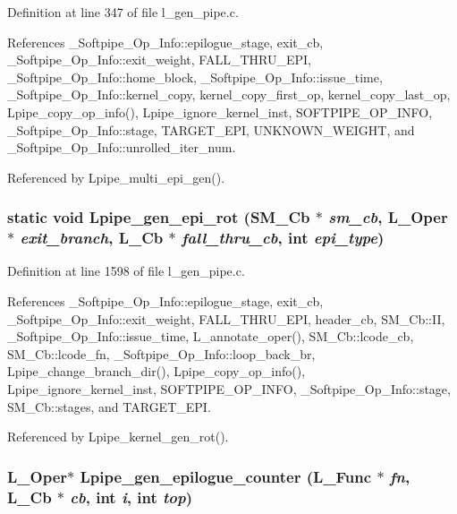 Definition at line 347 of file l\_\-gen\_\-pipe.c.

References \_\-Softpipe\_\-Op\_\-Info::epilogue\_\-stage, exit\_\-cb, \_\-Softpipe\_\-Op\_\-Info::exit\_\-weight, FALL\_\-THRU\_\-EPI, \_\-Softpipe\_\-Op\_\-Info::home\_\-block, \_\-Softpipe\_\-Op\_\-Info::issue\_\-time, \_\-Softpipe\_\-Op\_\-Info::kernel\_\-copy, kernel\_\-copy\_\-first\_\-op, kernel\_\-copy\_\-last\_\-op, Lpipe\_\-copy\_\-op\_\-info(), Lpipe\_\-ignore\_\-kernel\_\-inst, SOFTPIPE\_\-OP\_\-INFO, \_\-Softpipe\_\-Op\_\-Info::stage, TARGET\_\-EPI, UNKNOWN\_\-WEIGHT, and \_\-Softpipe\_\-Op\_\-Info::unrolled\_\-iter\_\-num.

Referenced by Lpipe\_\-multi\_\-epi\_\-gen().
\subsubsection{\setlength{\rightskip}{0pt plus 5cm}static void Lpipe\_\-gen\_\-epi\_\-rot (\bf{SM\_\-Cb} $\ast$ {\em sm\_\-cb}, L\_\-Oper $\ast$ {\em exit\_\-branch}, L\_\-Cb $\ast$ {\em fall\_\-thru\_\-cb}, int {\em epi\_\-type})\hspace{0.3cm}{\tt  [static]}}\label{l__gen__pipe_8c_5526a678946eac6147b0fa7128e53215}




Definition at line 1598 of file l\_\-gen\_\-pipe.c.

References \_\-Softpipe\_\-Op\_\-Info::epilogue\_\-stage, exit\_\-cb, \_\-Softpipe\_\-Op\_\-Info::exit\_\-weight, FALL\_\-THRU\_\-EPI, header\_\-cb, SM\_\-Cb::II, \_\-Softpipe\_\-Op\_\-Info::issue\_\-time, L\_\-annotate\_\-oper(), SM\_\-Cb::lcode\_\-cb, SM\_\-Cb::lcode\_\-fn, \_\-Softpipe\_\-Op\_\-Info::loop\_\-back\_\-br, Lpipe\_\-change\_\-branch\_\-dir(), Lpipe\_\-copy\_\-op\_\-info(), Lpipe\_\-ignore\_\-kernel\_\-inst, SOFTPIPE\_\-OP\_\-INFO, \_\-Softpipe\_\-Op\_\-Info::stage, SM\_\-Cb::stages, and TARGET\_\-EPI.

Referenced by Lpipe\_\-kernel\_\-gen\_\-rot().
\subsubsection{\setlength{\rightskip}{0pt plus 5cm}L\_\-Oper$\ast$ Lpipe\_\-gen\_\-epilogue\_\-counter (L\_\-Func $\ast$ {\em fn}, L\_\-Cb $\ast$ {\em cb}, int {\em i}, int {\em top})}\label{l__gen__pipe_8c_7be730411e03e5b53f8cf5cb5f54109b}




